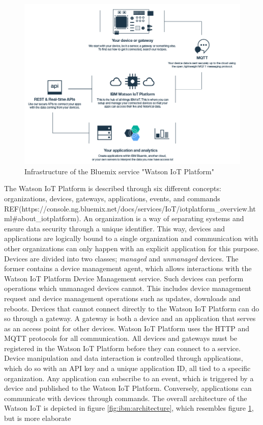 \begin{figure}[h!]
	\centering
	\includegraphics[width=\textwidth]{figures/ibm/infrastructure.png}
	\caption{Infrastructure of the Bluemix service "Watson IoT Platform"}
	\label{fig:ibm:infrastructure}
\end{figure}


The Watson IoT Platform is described through six different concepts: organizations, devices, gateways, applications, events, and commands REF(https://console.ng.bluemix.net/docs/services/IoT/iotplatform\_overview.html\#about\_iotplatform). An organization is a way of separating systems and ensure data security through a unique identifier. This way, devices and applications are logically bound to a single organization and communication with other organizations can only happen with an explicit application for this purpose. Devices are divided into two classes; \textit{managed} and \textit{unmanaged} devices. The former contains a device management agent, which allows interactions with the Watson IoT Platform Device Management service. Such devices can perform operations which unmanaged devices cannot. This includes device management request and device management operations such as updates, downloads and reboots. Devices that cannot connect directly to the Watson IoT Platform can do so through a gateway. A gateway is both a device and an application that serves as an access point for other devices. Watson IoT Platform uses the HTTP and MQTT protocols for all communication. All devices and gateways must be registered in the Watson IoT Platform before they can connect to a service. Device manipulation and data interaction is controlled through applications, which do so with an API key and a unique application ID, all tied to a specific organization. Any application can subscribe to an event, which is triggered by a device and published to the Watson IoT Platform. Conversely, applications can communicate with devices through commands. The overall architecture of the Watson IoT is depicted in figure \ref{fig:ibm:architecture}, which resembles figure \ref{fig:ibm:infrastructure}, but is more elaborate

